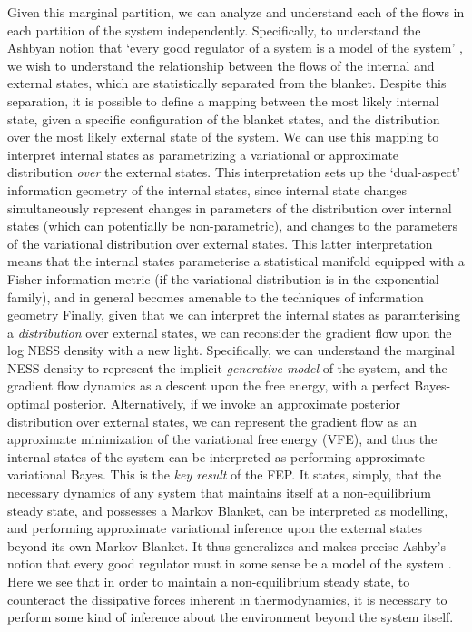 Given this marginal partition, we can analyze and understand each of the flows in each partition of the system independently. Specifically, to understand the Ashbyan notion that `every good regulator of a system is a model of the system' , we wish to understand the relationship between the flows of the internal and external states, which are statistically separated from the blanket. Despite this separation, it is possible to define a mapping between the most likely internal state, given a specific configuration of the blanket states, and the distribution over the most likely external state of the system. We can use this mapping to interpret internal states as parametrizing a variational or approximate distribution \emph{over} the external states. This interpretation sets up the `dual-aspect' information geometry of the internal states, since internal state changes simultaneously represent changes in parameters of the distribution over internal states (which can potentially be non-parametric), and changes to the parameters of the variational distribution over external states. This latter interpretation means that the internal states parameterise a statistical manifold equipped with a Fisher information metric (if the variational distribution is in the exponential family), and in general becomes amenable to the techniques of information geometry \citep{amari1995information,ollivier2017information} Finally, given that we can interpret the internal states as paramterising a \emph{distribution} over external states, we can reconsider the gradient flow upon the log NESS density with a new light. Specifically, we can understand the marginal NESS density to represent the implicit \emph{generative model} of the system, and the gradient flow dynamics as a descent upon the free energy, with a perfect Bayes-optimal posterior. Alternatively, if we invoke an approximate posterior distribution over external states, we can represent the gradient flow as an approximate minimization of the variational free energy (VFE), and thus the internal states of the system can be interpreted as performing approximate variational Bayes. This is the \emph{key result} of the FEP. It states, simply, that the necessary dynamics of any system that maintains itself at a non-equilibrium steady state, and possesses a Markov Blanket, can be interpreted as modelling, and performing approximate variational inference upon the external states beyond its own Markov Blanket. It thus generalizes and makes precise Ashby's notion that every good regulator must in some sense be a model of the system \citep{conant1970every}. Here we see that in order to maintain a non-equilibrium steady state, to counteract the dissipative forces inherent in thermodynamics, it is necessary to perform some kind of inference about the environment beyond the system itself. 

